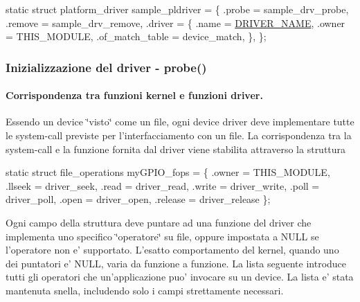 \begin{DoxyCode}
\textcolor{keyword}{static} \textcolor{keyword}{struct }platform\_driver sample\_pldriver = \{
    .probe  = sample\_drv\_probe,
    .remove = sample\_drv\_remove,
    .driver = \{
        .name  = \hyperlink{group___kernel-_module_ga25634d21648ca7fb7a2aca614bafaaeb}{DRIVER\_NAME},
        .owner = THIS\_MODULE,
        .of\_match\_table = device\_match,
    \},
\};
\end{DoxyCode}


\subsubsection*{Inizializzazione del driver -\/ probe()}

\paragraph*{Corrispondenza tra funzioni kernel e funzioni driver.}

Essendo un device \char`\"{}visto\char`\"{} come un file, ogni device driver deve implementare tutte le system-\/call previste per l'interfacciamento con un file. La corrispondenza tra la system-\/call e la funzione fornita dal driver viene stabilita attraverso la struttura


\begin{DoxyCode}
\textcolor{keyword}{static} \textcolor{keyword}{struct }file\_operations myGPIO\_fops = \{
    .owner      = THIS\_MODULE,
    .llseek     = driver\_seek,
    .read       = driver\_read,
    .write      = driver\_write,
    .poll       = driver\_poll,
    .open       = driver\_open,
    .release    = driver\_release
\};
\end{DoxyCode}


Ogni campo della struttura deve puntare ad una funzione del driver che implementa uno specifico \char`\"{}operatore\char`\"{} su file, oppure impostata a N\+U\+L\+L se l'operatore non e' supportato. L'esatto comportamento del kernel, quando uno dei puntatori e' N\+U\+L\+L, varia da funzione a funzione. La lista seguente introduce tutti gli operatori che un'applicazione puo' invocare su un device. La lista e' stata mantenuta snella, includendo solo i campi strettamente necessari.


